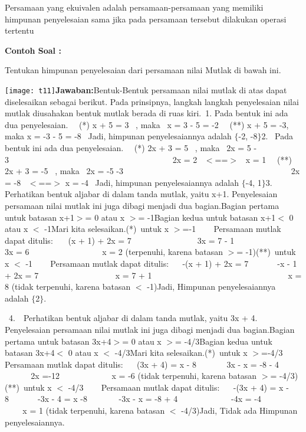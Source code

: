 \documentclass[11pt,fleqn]{book} %
\begin{document}
\noindent Persamaan yang ekuivalen adalah persamaan-persamaan yang memiliki himpunan penyelesaian sama jika pada persamaan tersebut dilakukan operasi tertentu

\noindent \textbf{}

\noindent \textbf{}

\noindent \textbf{}

\noindent \textbf{}

\noindent \textbf{}

\noindent \textbf{Contoh Soal :}

\noindent Tentukan himpunan penyelesaian dari persamaan nilai Mutlak di bawah ini.

\noindent \texttt{[image: t11]}\textbf{Jawaban:}Bentuk-Bentuk persamaan nilai mutlak di atas dapat diselesaikan sebagai berikut. Pada prinsipnya, langkah langkah penyelesaian nilai mutlak diusahakan bentuk mutlak berada di ruas kiri.~1. Pada bentuk ini ada dua penyelesaian.~~ (*) x + 5 = 3~ , maka~ x = 3 - 5 = -2~~ (**) x + 5 = -3, maka x = -3 - 5 = -8~ Jadi, himpunan penyelesaiannya adalah $\{$-2, -8$\}$2.~ Pada bentuk ini ada dua penyelesaian.~~ (*) 2x + 3 = 5~ , maka~ 2x = 5 - 3~~~~~~~~~~~~~~~~~~~~~~~~~~~~~~~~~~~~~~~ 2x = 2~ $<$==$>$~ x = 1~~ (**) 2x + 3 = -5~ , maka~ 2x = -5 -3~~~~~~~~~~~~~~~~~~~~~~~~~~~~~~~~~~~~~~~~ 2x = -8~ $<$==$>$ x = -4~ Jadi, himpunan penyelesaiannya adalah $\{$-4, 1$\}$3. Perhatikan bentuk aljabar di dalam tanda mutlak, yaitu x+1. Penyelesaian persamaan nilai mutlak ini juga dibagi menjadi dua bagian.Bagian pertama untuk batasan x+1$>$= 0 atau x $>$= -1Bagian kedua untuk batasan x+1$<$ 0 atau x $<$ -1Mari kita selesaikan.(*)~untuk x $>$=-1~ ~~ Persamaan mutlak dapat ditulis:~~~ (x + 1) + 2x = 7~ ~ ~ ~ ~ ~ ~ ~ ~~ 3x = 7 - 1~ ~ ~ ~ ~ ~ ~ ~ ~~ 3x = 6~ ~ ~ ~ ~ ~ ~ ~ ~ ~~ x = 2 (terpenuhi, karena batasan $>$= -1)(**)~untuk x $<$ -1~ ~~ Persamaan mutlak dapat ditulis:~ ~ -(x + 1) + 2x = 7~~ ~ ~~ -x - 1 + 2x = 7~ ~ ~ ~ ~ ~ ~ ~ ~~ ~~ x = 7 + 1~ ~ ~ ~ ~ ~ ~ ~~~~ ~ ~ ~ ~ ~ ~ ~ ~ ~ ~ x = 8 (tidak terpenuhi, karena batasan $<$ -1)Jadi, Himpunan penyelesaiannya adalah $\{$2$\}$.

\noindent ~4.~~Perhatikan bentuk aljabar di dalam tanda mutlak, yaitu 3x + 4. Penyelesaian persamaan nilai mutlak ini juga dibagi menjadi dua bagian.Bagian pertama untuk batasan 3x+4$>$= 0 atau x $>$= -4/3Bagian kedua untuk batasan 3x+4$<$ 0 atau x $<$ -4/3Mari kita selesaikan.(*)~untuk x $>$=-4/3~ ~~ Persamaan mutlak dapat ditulis:~ ~ (3x + 4) = x - 8~ ~~~~~ 3x - x = -8 - 4~ ~ ~ ~ ~~~~ 2x =-12~ ~ ~ ~ ~ ~~ ~ x = -6 (tidak terpenuhi, karena batasan $>$= -4/3)(**)~untuk x $<$ -4/3~ ~~ Persamaan mutlak dapat ditulis:~ ~ -(3x + 4) = x - 8~~ ~ ~~ -3x - 4 = x -8~ ~ ~ ~~ -3x - x = -8 + 4~~ ~ ~ ~~~ ~ ~ -4x = -4~ ~ ~ ~~~ ~ ~ ~~ x = 1 (tidak terpenuhi, karena batasan $<$ -4/3)Jadi, Tidak ada Himpunan penyelesaiannya.
\end{document}
